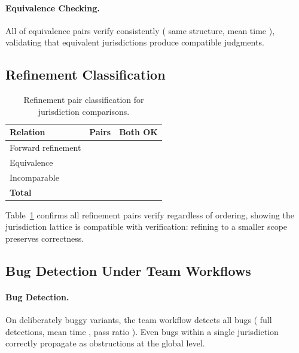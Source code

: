 \documentclass[11pt]{article}
\begin{document}
\paragraph{Equivalence Checking.}
All \compEquivBothVerified{} of \compEquivPairs{} equivalence pairs verify
consistently (\compEquivSameStructure{} same structure, mean time
\compEquivMeanTime{}), validating that equivalent jurisdictions produce
compatible judgments.

\subsection{Refinement Classification}

\begin{table}[t]
\centering
\caption{Refinement pair classification for jurisdiction comparisons.}
\label{tab:refinement}
\begin{tabular}{lrr}
\toprule
\textbf{Relation} & \textbf{Pairs} & \textbf{Both OK} \\
\midrule
Forward refinement   & \suppForwardPairs{} & \suppForwardBothOk{} \\
Equivalence          & \suppEquivPairs{} & \suppEquivBothOk{} \\
Incomparable         & \suppIncompPairs{} & \suppIncompBothOk{} \\
\midrule
\textbf{Total}       & \suppTotalPairs{} & \suppTotalPairs{} \\
\bottomrule
\end{tabular}
\end{table}

Table~\ref{tab:refinement} confirms all refinement pairs verify
regardless of ordering, showing the jurisdiction lattice is compatible with
verification: refining to a smaller scope preserves correctness.

\subsection{Bug Detection Under Team Workflows}

\paragraph{Bug Detection.}
On \compBuggyCount{} deliberately buggy variants, the team workflow detects all
bugs (\compBuggyFullPass{} full detections, mean time \compBuggyMeanTime{},
pass ratio \compBuggyMeanPropRatio{}). Even bugs within a single jurisdiction
correctly propagate as obstructions at the global level.
\end{document}

